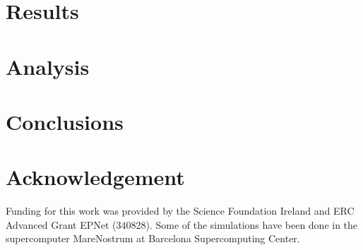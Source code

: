 \documentclass[letterpaper]{article}
\begin{document}
\section{Results}\label{sec:results}


\section{Analysis}


\section{Conclusions}\label{sec:conc}


\section{Acknowledgement}
Funding for this work was provided by the Science Foundation Ireland and ERC Advanced Grant EPNet (340828).
Some of the simulations have been done in the supercomputer MareNostrum at Barcelona Supercomputing Center.


\end{document}
